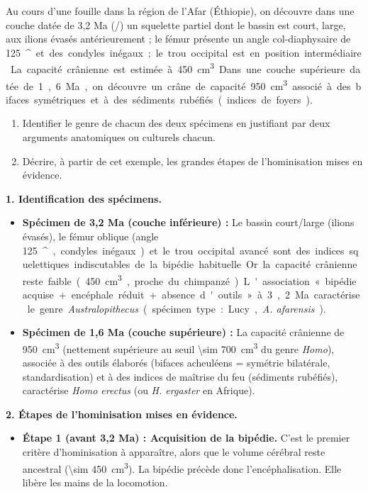 \documentclass[11pt]{article}
\providecommand{\degree}{^{\circ}}
\newcommand{\cle}[1]{{\popxbold\color{popdark}#1}}
\begin{document}
\begin{exoresolu}
Au cours d'une fouille dans la région de l'Afar (Éthiopie), on découvre dans une couche datée de 3,2 Ma (/) un squelette partiel dont le bassin est court, large, aux ilions évasés antérieurement ; le fémur présente un angle col-diaphysaire de \SI{125}{\degree} et des condyles inégaux ; le trou occipital est en position intermédiaire. La capacité crânienne est estimée à \SI{450}{cm^3}. Dans une couche supérieure datée de 1,6 Ma, on découvre un crâne de capacité \SI{950}{cm^3} associé à des bifaces symétriques et à des sédiments rubéfiés (indices de foyers).
\begin{enumerate}
\item Identifier le genre de chacun des deux spécimens en justifiant par deux arguments anatomiques ou culturels chacun.
\item Décrire, à partir de cet exemple, les grandes étapes de l'hominisation mises en évidence.
\end{enumerate}
\tcblower
\textbf{1. Identification des spécimens.}
\begin{itemize}
\item \textbf{Spécimen de 3,2 Ma (couche inférieure) :} Le bassin court/large (ilions évasés), le fémur oblique (angle \SI{125}{\degree}, condyles inégaux) et le trou occipital avancé sont des indices squelettiques indiscutables de la \cle{bipédie} habituelle. Or la capacité crânienne reste faible (\SI{450}{cm^3}, proche du chimpanzé). L'association « bipédie acquise + encéphale réduit + absence d'outils » à 3,2 Ma caractérise le genre \emph{Australopithecus} (spécimen type : Lucy, \emph{A. afarensis}).
\item \textbf{Spécimen de 1,6 Ma (couche supérieure) :} La capacité crânienne de \SI{950}{cm^3} (nettement supérieure au seuil \SI{\sim 700}{cm^3} du genre \emph{Homo}), associée à des outils élaborés (bifaces acheuléens = symétrie bilatérale, standardisation) et à des indices de maîtrise du feu (sédiments rubéfiés), caractérise \emph{Homo erectus} (ou \emph{H. ergaster} en Afrique).
\end{itemize}
\textbf{2. Étapes de l'hominisation mises en évidence.}
\begin{itemize}
\item \textbf{Étape 1 (avant 3,2 Ma) : Acquisition de la bipédie.} C'est le premier critère d'hominisation à apparaître, alors que le volume cérébral reste ancestral (\SI{\sim 450}{cm^3}). La bipédie précède donc l'encéphalisation. Elle libère les mains de la locomotion.

\end{itemize}
\end{exoresolu}
\end{document}
